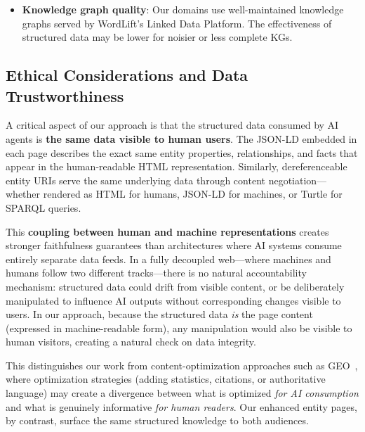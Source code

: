 \documentclass[runningheads]{llncs}
\begin{document}
\begin{itemize}
          to Vertex AI Vector Search 2.0 with \texttt{gemini-embedding-001}.
          We chose this system intentionally: it represents the
          flat-text ingestion architecture used by most AI search
          systems that operate independently of Google or Bing's
          proprietary index. Systems with structured-data-aware
          ingestion may show different sensitivity to JSON-LD markup.
    \item \textbf{Knowledge graph quality}: Our domains use
          well-maintained knowledge graphs served by WordLift's
          Linked Data Platform. The effectiveness of structured data
          may be lower for noisier or less complete KGs.
\end{itemize}

\subsection{Ethical Considerations and Data Trustworthiness}

A critical aspect of our approach is that the structured data consumed
by AI agents is \textbf{the same data visible to human users}.  The
JSON-LD embedded in each page describes the exact same entity
properties, relationships, and facts that appear in the human-readable
HTML representation.  Similarly, dereferenceable entity URIs serve the
same underlying data through content negotiation---whether rendered as
HTML for humans, JSON-LD for machines, or Turtle for SPARQL queries.

This \textbf{coupling between human and machine representations}
creates stronger faithfulness guarantees than architectures where AI
systems consume entirely separate data feeds.  In a fully decoupled
web---where machines and humans follow two different tracks---there is
no natural accountability mechanism: structured data could drift from
visible content, or be deliberately manipulated to influence AI outputs
without corresponding changes visible to users.  In our approach,
because the structured data \emph{is} the page content (expressed in
machine-readable form), any manipulation would also be visible to human
visitors, creating a natural check on data integrity.

This distinguishes our work from content-optimization approaches such
as GEO~\cite{aggarwal2023geo}, where optimization strategies (adding
statistics, citations, or authoritative language) may create a
divergence between what is optimized \emph{for AI consumption} and what
is genuinely informative \emph{for human readers}.  Our enhanced entity
pages, by contrast, surface the same structured knowledge to both
audiences.
\end{document}
